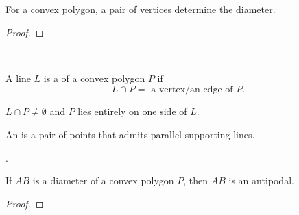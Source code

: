 \begin{frame}{}
  \vspace{0.60cm}
  \begin{theorem}
    For a convex polygon, a pair of vertices determine the diameter.
  \end{theorem}

  \pause
  \vspace{0.30cm}
  \begin{proof}
  \end{proof}

  \pause
  \vspace{0.30cm}
  \begin{center}
     \\[10pt] \pause
  \end{center}
\end{frame}

\begin{frame}{}
  \begin{definition}
    A line $L$ is a  of a convex polygon $P$ if
    \[
      L \cap P = \text{ a vertex/an edge of } P.
    \]
  \end{definition}
  \pause
  \vspace{0.20cm}
  \centerline{$L \cap P \neq \emptyset$ and $P$ lies entirely on one side of $L$.}

  \pause
  \vspace{0.50cm}
  \begin{definition}[Antipodal]
    An  is a pair of points that admits parallel supporting lines.
  \end{definition}

  \pause
  \vspace{0.60cm}
  \centerline{.}
\end{frame}

\begin{frame}{}
  \begin{theorem}[]
    If $AB$ is a diameter of a convex polygon $P$, then $AB$ is an antipodal.
  \end{theorem}

  \pause
  \vspace{0.50cm}
  \begin{proof}
    \pause
  \end{proof}
\end{frame}

